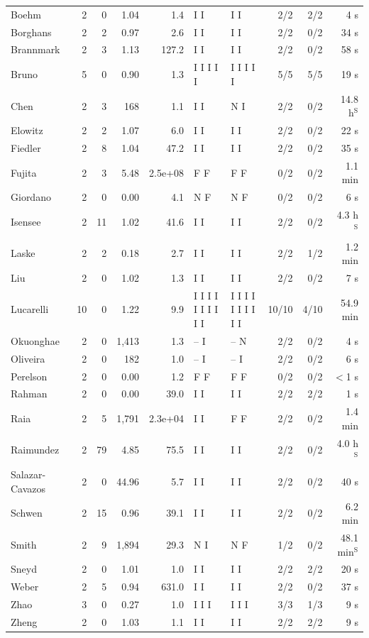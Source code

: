 \begin{longtable}{@{}lrrrrllrrr@{}}
Boehm & 2 & 0 & 1.04 & 1.4 & I I & I I & 2/2 & 2/2 & 4 s \\
Borghans & 2 & 2 & 0.97 & 2.6 & I I & I I & 2/2 & 0/2 & 34 s \\
Brannmark & 2 & 3 & 1.13 & 127.2 & I I & I I & 2/2 & 0/2 & 58 s \\
Bruno & 5 & 0 & 0.90 & 1.3 & I I I I I & I I I I I & 5/5 & 5/5 & 19 s \\
Chen & 2 & 3 & 168 & 1.1 & I I & N I & 2/2 & 0/2 & 14.8 h$^{\mathrm{S}}$ \\
Elowitz & 2 & 2 & 1.07 & 6.0 & I I & I I & 2/2 & 0/2 & 22 s \\
Fiedler & 2 & 8 & 1.04 & 47.2 & I I & I I & 2/2 & 0/2 & 35 s \\
Fujita & 2 & 3 & 5.48 & 2.5e+08 & F F & F F & 0/2 & 0/2 & 1.1 min \\
Giordano & 2 & 0 & 0.00 & 4.1 & N F & N F & 0/2 & 0/2 & 6 s \\
Isensee & 2 & 11 & 1.02 & 41.6 & I I & I I & 2/2 & 0/2 & 4.3 h$^{\mathrm{S}}$ \\
Laske & 2 & 2 & 0.18 & 2.7 & I I & I I & 2/2 & 1/2 & 1.2 min \\
Liu & 2 & 0 & 1.02 & 1.3 & I I & I I & 2/2 & 0/2 & 7 s \\
Lucarelli & 10 & 0 & 1.22 & 9.9 & I I I I I I I I I I & I I I I I I I I I I & 10/10 & 4/10 & 54.9 min \\
Okuonghae & 2 & 0 & 1,413 & 1.3 & -- I & -- N & 2/2 & 0/2 & 4 s \\
Oliveira & 2 & 0 & 182 & 1.0 & -- I & -- I & 2/2 & 0/2 & 6 s \\
Perelson & 2 & 0 & 0.00 & 1.2 & F F & F F & 0/2 & 0/2 & $<$1 s \\
Rahman & 2 & 0 & 0.00 & 39.0 & I I & I I & 2/2 & 2/2 & 1 s \\
Raia & 2 & 5 & 1,791 & 2.3e+04 & I I & F F & 2/2 & 0/2 & 1.4 min \\
Raimundez & 2 & 79 & 4.85 & 75.5 & I I & I I & 2/2 & 0/2 & 4.0 h$^{\mathrm{S}}$ \\
Salazar-Cavazos & 2 & 0 & 44.96 & 5.7 & I I & I I & 2/2 & 0/2 & 40 s \\
Schwen & 2 & 15 & 0.96 & 39.1 & I I & I I & 2/2 & 0/2 & 6.2 min \\
Smith & 2 & 9 & 1,894 & 29.3 & N I & N F & 1/2 & 0/2 & 48.1 min$^{\mathrm{S}}$ \\
Sneyd & 2 & 0 & 1.01 & 1.0 & I I & I I & 2/2 & 2/2 & 20 s \\
Weber & 2 & 5 & 0.94 & 631.0 & I I & I I & 2/2 & 0/2 & 37 s \\
Zhao & 3 & 0 & 0.27 & 1.0 & I I I & I I I & 3/3 & 1/3 & 9 s \\
Zheng & 2 & 0 & 1.03 & 1.1 & I I & I I & 2/2 & 2/2 & 9 s \\
\bottomrule
\end{longtable}
